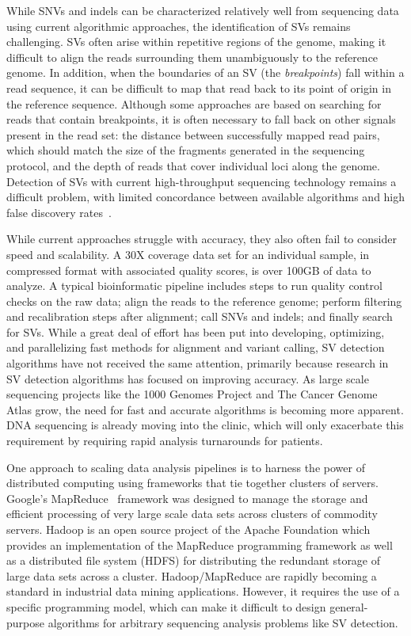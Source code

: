 While SNVs and indels can be characterized relatively well from sequencing data using current algorithmic approaches, the identification of SVs remains challenging. SVs often arise within repetitive regions of the genome, making it difficult to align the reads surrounding them unambiguously to the reference genome. In addition, when the boundaries of an SV (the \emph{breakpoints}) fall within a read sequence, it can be difficult to map that read back to its point of origin in the reference sequence. Although some approaches are based on searching for reads that contain breakpoints, it is often necessary to fall back on other signals present in the read set: the distance between successfully mapped read pairs, which should match the size of the fragments generated in the sequencing protocol, and the depth of reads that cover individual loci along the genome. Detection of SVs with current high-throughput sequencing technology remains a difficult problem, with limited concordance between available algorithms and high false discovery rates~\cite{Mills:2011p1611}.

While current approaches struggle with accuracy, they also often fail to consider speed and scalability. A 30X coverage data set for an individual sample, in compressed format with associated quality scores, is over 100GB of data to analyze. A typical bioinformatic pipeline includes steps to run quality control checks on the raw data; align the reads to the reference genome; perform filtering and recalibration steps after alignment; call SNVs and indels; and finally search for SVs. While a great deal of effort has been put into developing, optimizing, and parallelizing fast methods for alignment and variant calling, SV detection algorithms have not received the same attention, primarily because research in SV detection algorithms has focused on improving accuracy. As large scale sequencing projects like the 1000 Genomes Project and The Cancer Genome Atlas grow, the need for fast and accurate algorithms is becoming more apparent. DNA sequencing is already moving into the clinic, which will only exacerbate this requirement by requiring rapid analysis turnarounds for patients.

One approach to scaling data analysis pipelines is to harness the power of distributed computing using frameworks that tie together clusters of servers. Google's MapReduce~\cite{Dean:2008p277} framework was designed to manage the storage and efficient processing of very large scale data sets across clusters of commodity servers. Hadoop is an open source project of the Apache Foundation which provides an implementation of the MapReduce programming framework as well as a distributed file system (HDFS) for distributing the redundant storage of large data sets across a cluster. Hadoop/MapReduce are rapidly becoming a standard in industrial data mining applications. However, it requires the use of a specific programming model, which can make it difficult to design general-purpose algorithms for arbitrary sequencing analysis problems like SV detection. 

